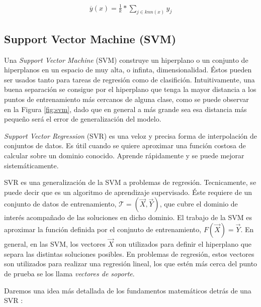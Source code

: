       \begin{align}
        \overline{y}(x) = \frac{1}{k} * \sum_{j \in knn(x)} y_{j}
      \end{align}



  \subsection{Support Vector Machine (SVM)}

    \par Una \textit{Support Vector Machine} (SVM) \cite{first_svm} construye un
      hiperplano o un conjunto de hiperplanos en un espacio
      de muy alta, o infinta, dimensionalidad. Éstos pueden ser usados tanto para
      tareas de regresión como de clasifición. Intuitivamente, una buena separación
      se consigue por el hiperplano que tenga la mayor distancia a los puntos de
      entrenamiento más cercanos de alguna clase, como se puede observar en la
      Figura \ref{fig:svm}, dado que en general
      a más grande sea esa distancia más pequeño será el error de generalización del
      modelo.

    \par \textit{Support Vector Regression} (SVR)\cite{support_vector_regression, review_svr}
      es una veloz y precisa forma de interpolación de conjuntos de datos.
      Es útil cuando se quiere aproximar una función costosa de calcular sobre un
      dominio conocido. Aprende rápidamente y se puede mejorar sistemáticamente.

    \par SVR es una generalización de la SVM a problemas de regresión. Tecnicamente,
      se puede decir que es un algoritmo de aprendizaje supervisado. Éste
      requiere de un conjunto de datos de entrenamiento,
      $\mathcal{T} = (\vec{X}, \vec{Y})$, que cubre el dominio de interés acompañado
      de las soluciones en dicho dominio. El trabajo de la SVM es aproximar la función
      definida por el conjnuto de entrenamiento, $F(\vec{X}) = \vec{Y}$. En general,
      en las SVM, los vectores $\vec{X}$ son utilizados para definir el hiperplano que
      separa las distintas soluciones posibles. En problemas de regresión, estos
      vectores son utilizados para realizar una regresión lineal, los que estén
      más cerca del punto de prueba se los llama \textit{vectores de soporte}.

      Daremos una idea más detallada de los fundamentos matemáticos detrás de una
      SVR \cite{svr_tutorial}:

